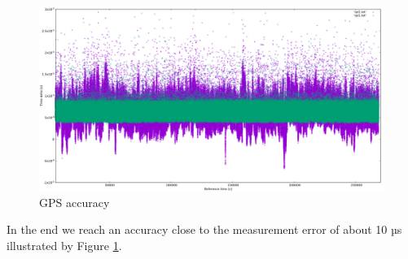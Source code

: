 \begin{figure}[H]
	\centering
	\includegraphics[width=1.0\textwidth]{figures/plot_gps3.png}
	\caption{GPS accuracy}
	\label{fig:plot_gps3}
\end{figure}

In the end we reach an accuracy close to the measurement error of about 10 µs illustrated by Figure \ref{fig:plot_gps3}.

